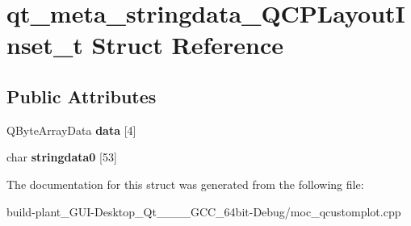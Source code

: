 \hypertarget{structqt__meta__stringdata__QCPLayoutInset__t}{}\section{qt\+\_\+meta\+\_\+stringdata\+\_\+\+Q\+C\+P\+Layout\+Inset\+\_\+t Struct Reference}
\label{structqt__meta__stringdata__QCPLayoutInset__t}
\subsection*{Public Attributes}
\begin{DoxyCompactItemize}
\item 
\mbox{\label{structqt__meta__stringdata__QCPLayoutInset__t_ae85a598291582d31cc12989c0279ea44}} 
Q\+Byte\+Array\+Data {\bfseries data} \mbox{[}4\mbox{]}
\item 
\mbox{\label{structqt__meta__stringdata__QCPLayoutInset__t_a7cc558fa6388df25517a33006f4a76a2}} 
char {\bfseries stringdata0} \mbox{[}53\mbox{]}
\end{DoxyCompactItemize}


The documentation for this struct was generated from the following file\+:\begin{DoxyCompactItemize}
\item 
build-\/plant\+\_\+\+G\+U\+I-\/\+Desktop\+\_\+\+Qt\+\_\+\_\+\_\+\_\+\+G\+C\+C\+\_\+64bit-\/\+Debug/moc\+\_\+qcustomplot.\+cpp\end{DoxyCompactItemize}
